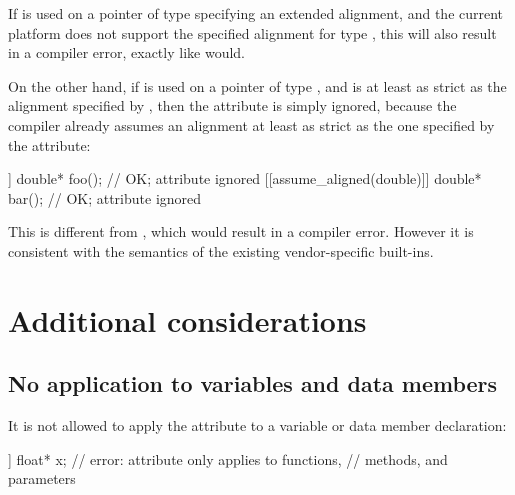 If  is used on a pointer of type  specifying an extended alignment, and the current platform does not support the specified alignment for type , this will also result in a compiler error, exactly like  would.

On the other hand, if  is used on a pointer of type , and  is at least as strict as the alignment specified by , then the attribute is simply ignored, because the compiler already assumes
an alignment at least as strict as the one specified by the attribute:

\begin{codeblock}
[[assume_aligned(char)]] double* foo();     // OK; attribute ignored
[[assume_aligned(double)]] double* bar();   // OK; attribute ignored
\end{codeblock}

This is different from , which would result in a compiler error. However it is consistent with the semantics of the existing vendor-specific built-ins.

\section{Additional considerations}

\subsection{No application to variables and data members}
\label{subsec:novars}

It is not allowed to apply the attribute to a variable or data member declaration:

\begin{codeblock}
[[assume_aligned(64)]] float* x;   // error: attribute only applies to functions, 
                                   // methods, and parameters
\end{codeblock}

